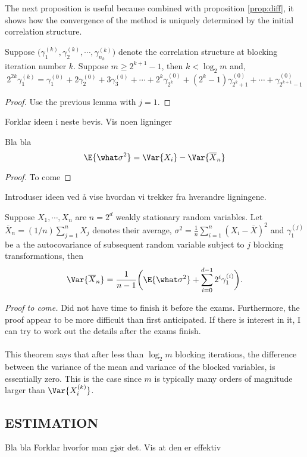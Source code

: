 \documentclass[11pt,english,a4paper]{article}
\begin{document}
The next proposition is useful because combined with proposition \ref{prop:diff}, it shows how the convergence of the method is uniquely determined by the initial correlation structure.
\begin{prop}
Suppose $\big(\gamma_1^{(k)} , \gamma_2^{(k)}, \cdots, \gamma_{n_k}^{(k)}\big)$ denote the correlation structure at blocking iteration number $k$. Suppose $m \geq 2^{k+1} - 1$, then $k < \log_2 m$ and,
\[
2^{  2k} \gamma_1^{(k)} = \gamma_1^{(0)} + 2\gamma_2^{(0)} + 3 \gamma_3^{(0)} + \cdots +2^k \gamma_{2^k}^{(0)} + (2^k-1)\gamma_{2^k+1}^{(0)} + \cdots + \gamma_{2^{k+1}-1}^{(0)}
\] \label{prop:sequence}
\end{prop}
\begin{proof}
Use the previous lemma with $j=1$.
\end{proof}
Forklar ideen i neste bevis. Vis noen ligninger
\begin{lemma}
Bla bla
\[
\E{\what \sigma^2} = \Var{X_i} - \Var{ \overline X_n} 
\]
 \label{prop:sigmahat}
\end{lemma}
\begin{proof}
To come
\end{proof}
Introduser ideen ved å vise hvordan vi trekker fra hverandre ligningene.
\begin{theorem}
Suppose $X_1,\cdots, X_n$ are $n = 2^d$ weakly stationary random variables. Let $\overline X_n = (1/n)\sum_{j=1}^n X_j$ denotes their average, $\sigma^2 = \frac{1}{n} \sum_{i=1}^n (X_i - \overline{X})^2$ and $\gamma^{(j)}_1$ be a the autocovariance of subsequent random variable subject to $j$ blocking transformations, then
\[
\Var{\overline{X}_n} = \frac{1}{n-1} \bigg( \E{\what \sigma^2} + \sum_{i=0}^{d-1}2^i \gamma^{(i)}_1  \bigg).
\]
\end{theorem}
\textit{Proof to come.} Did not have time to finish it before the exams. Furthermore, the proof appear to be more difficult than first anticipated. If there is interest in it, I can try to work out the details after the exams finish.\\
\\
This theorem says that after less than $\log_2 m$ blocking iterations, the difference between the variance of the mean and variance of the blocked variables, is essentially zero. This is the case since $m$ is typically many orders of magnitude larger than $\Var{X^{(k)}_i}$.
\subsection*{\uppercase{Estimation}}
Bla bla Forklar hvorfor man gjør det. Vis at den er effektiv
\end{document}
